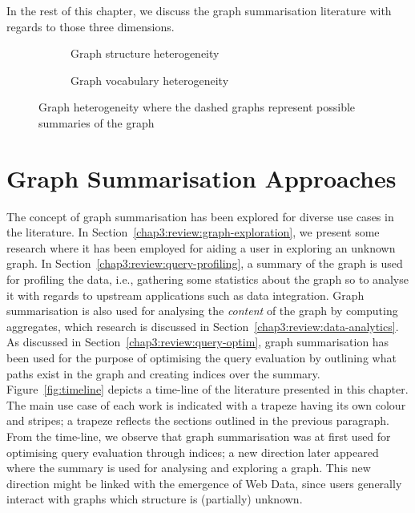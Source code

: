 In the rest of this chapter, we discuss the graph summarisation literature with regards to those three dimensions.

\begin{figure}
	\centering
	\begin{subfigure}{.5\textwidth}
		\resizebox{\textwidth}{!}{
			
		}
		\caption{Graph structure heterogeneity}
		\label{chap3:review:fig:hetero-struct}
	\end{subfigure}
	\qquad
	\begin{subfigure}{.42\textwidth}
		\resizebox{\textwidth}{!}{
			
		}
		\caption{Graph vocabulary heterogeneity}
		\label{chap3:review:fig:hetero-voc}
	\end{subfigure}
	\caption{Graph heterogeneity where the dashed graphs represent possible summaries of the graph}
	\label{chap3:review:fig:graph-heterogeneous}
\end{figure}

\section{Graph Summarisation Approaches}

The concept of graph summarisation has been explored for diverse use cases in the literature. In Section~\ref{chap3:review:graph-exploration}, we present some research where it has been employed for aiding a user in exploring an unknown graph. In Section~\ref{chap3:review:query-profiling}, a summary of the graph is used for profiling the data, i.e., gathering some statistics about the graph so to analyse it with regards to upstream applications such as data integration. Graph summarisation is also used for analysing the \emph{content} of the graph by computing aggregates, which research is discussed in Section~\ref{chap3:review:data-analytics}. As discussed in Section~\ref{chap3:review:query-optim}, graph summarisation has been used for the purpose of optimising the query evaluation by outlining what paths exist in the graph and creating indices over the summary.\\

Figure~\ref{fig:timeline} depicts a time-line of the literature presented in this chapter. The main use case of each work is indicated with a trapeze having its own colour and stripes; a trapeze reflects the sections outlined in the previous paragraph. From the time-line, we observe that graph summarisation was at first used for optimising query evaluation through indices; a new direction later appeared where the summary is used for analysing and exploring a graph. This new direction might be linked with the emergence of Web Data, since users generally interact with graphs which structure is (partially) unknown.

